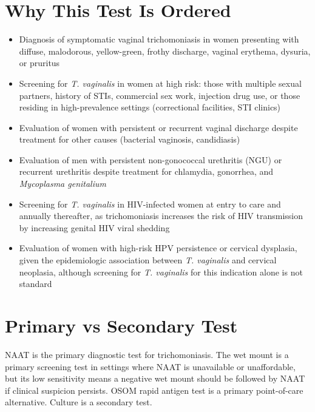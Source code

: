 \section*{Why This Test Is Ordered}
\begin{itemize}
  \item Diagnosis of symptomatic vaginal trichomoniasis in women presenting with diffuse, malodorous, yellow-green, frothy discharge, vaginal erythema, dysuria, or pruritus
  \item Screening for \textit{T. vaginalis} in women at high risk: those with multiple sexual partners, history of STIs, commercial sex work, injection drug use, or those residing in high-prevalence settings (correctional facilities, STI clinics)
  \item Evaluation of women with persistent or recurrent vaginal discharge despite treatment for other causes (bacterial vaginosis, candidiasis)
  \item Evaluation of men with persistent non-gonococcal urethritis (NGU) or recurrent urethritis despite treatment for chlamydia, gonorrhea, and \textit{Mycoplasma genitalium}
  \item Screening for \textit{T. vaginalis} in HIV-infected women at entry to care and annually thereafter, as trichomoniasis increases the risk of HIV transmission by increasing genital HIV viral shedding
  \item Evaluation of women with high-risk HPV persistence or cervical dysplasia, given the epidemiologic association between \textit{T. vaginalis} and cervical neoplasia, although screening for \textit{T. vaginalis} for this indication alone is not standard
\end{itemize}

\section*{Primary vs Secondary Test}
NAAT is the primary diagnostic test for trichomoniasis. The wet mount is a primary screening test in settings where NAAT is unavailable or unaffordable, but its low sensitivity means a negative wet mount should be followed by NAAT if clinical suspicion persists. OSOM rapid antigen test is a primary point-of-care alternative. Culture is a secondary test.

